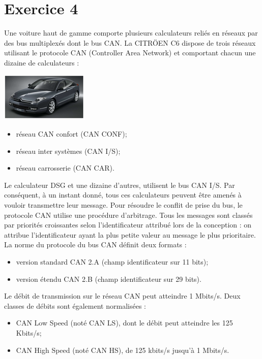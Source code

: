 \documentclass[10pt]{article}
\begin{document}
\section{Exercice 4}
\setcounter{subparagraph}{0}
\begin{minipage}[c]{.7\linewidth}
Une voiture haut de gamme comporte plusieurs calculateurs reliés en réseaux par des bus multiplexés dont le bus CAN. 
La CITRÖEN C6 dispose de trois réseaux utilisant le protocole CAN (Controller  Area  Network) et comportant chacun une dizaine de calculateurs :
\end{minipage}\hfill
\begin{minipage}[c]{.25\linewidth}
\begin{center}
\includegraphics[width=.95\textwidth]{images/im_11}
\end{center}
\end{minipage}

\begin{itemize}
\item réseau CAN confort (CAN CONF); 
\item réseau inter systèmes (CAN I/S); 
\item réseau carrosserie (CAN CAR). 
\end{itemize}

Le calculateur DSG et une dizaine d’autres, utilisent le bus CAN I/S. Par conséquent, à un instant donné, tous ces calculateurs peuvent être amenés à vouloir transmettre leur message. Pour résoudre le conflit de prise du bus, le protocole CAN utilise une procédure d’arbitrage. Tous les messages sont classés par priorités croissantes selon l’identificateur attribué lors de la conception : on attribue l’identificateur ayant la plus petite valeur au message le plus prioritaire. 
La norme du protocole du bus CAN définit deux formats :
\begin{itemize}
\item version standard CAN 2.A (champ identificateur sur 11 bits);
\item version étendu CAN 2.B (champ identificateur sur 29 bits).
\end{itemize}
Le débit de transmission sur le réseau CAN peut atteindre 1 Mbits/s.
Deux classes de débits sont également normalisées :
\begin{itemize}
\item CAN Low Speed (noté CAN LS), dont le débit peut atteindre les 125 Kbits/s;
\item CAN High Speed (noté CAN HS), de 125 kbits/s jusqu’à 1 Mbits/s.
\end{itemize}
\end{document}
